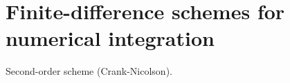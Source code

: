 \documentclass[12pt]{report}
\begin{document}
\chapter{Finite-difference schemes for numerical integration}
Second-order scheme (Crank-Nicolson).
\end{document}
